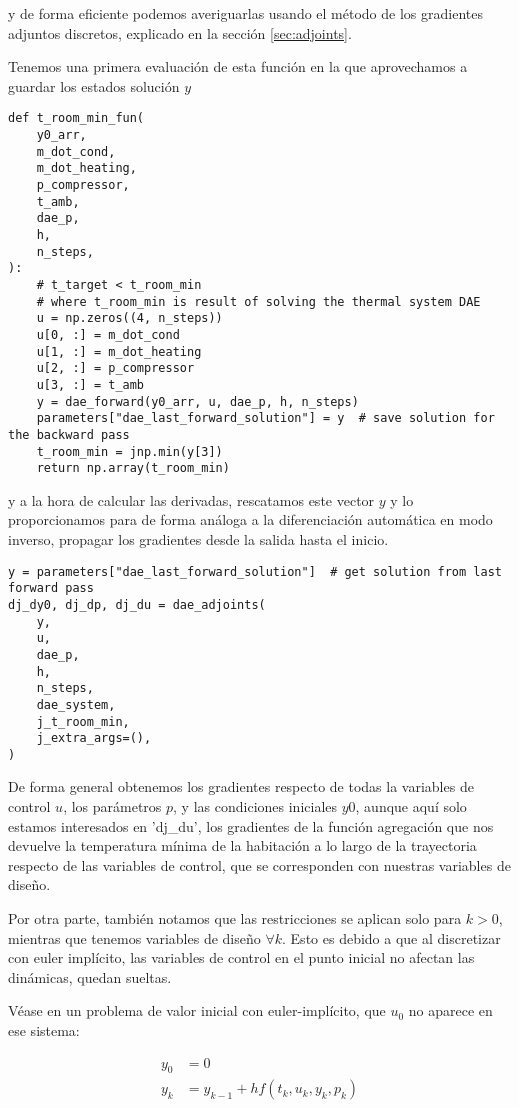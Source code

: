 y de forma eficiente podemos averiguarlas usando el método de los gradientes
adjuntos discretos, explicado en la sección \ref{sec:adjoints}.

Tenemos una primera evaluación de esta función en la que aprovechamos a guardar
los estados solución $y$

\begin{verbatim}
def t_room_min_fun(
    y0_arr,
    m_dot_cond,
    m_dot_heating,
    p_compressor,
    t_amb,
    dae_p,
    h,
    n_steps,
):
    # t_target < t_room_min
    # where t_room_min is result of solving the thermal system DAE
    u = np.zeros((4, n_steps))
    u[0, :] = m_dot_cond
    u[1, :] = m_dot_heating
    u[2, :] = p_compressor
    u[3, :] = t_amb
    y = dae_forward(y0_arr, u, dae_p, h, n_steps)
    parameters["dae_last_forward_solution"] = y  # save solution for the backward pass
    t_room_min = jnp.min(y[3])
    return np.array(t_room_min)
\end{verbatim}

y a la hora de calcular las derivadas, rescatamos este vector $y$ y lo
proporcionamos para de forma análoga a la diferenciación automática en modo
inverso, propagar los gradientes desde la salida hasta el inicio.

\begin{verbatim}
y = parameters["dae_last_forward_solution"]  # get solution from last forward pass
dj_dy0, dj_dp, dj_du = dae_adjoints(
    y,
    u,
    dae_p,
    h,
    n_steps,
    dae_system,
    j_t_room_min,
    j_extra_args=(),
)
\end{verbatim}

De forma general obtenemos los gradientes respecto de todas la variables de
control $u$, los parámetros $p$, y las condiciones iniciales $y0$, aunque aquí
solo estamos interesados en 'dj\_du', los gradientes de la función agregación
que nos devuelve la temperatura mínima de la habitación a lo largo de la
trayectoria respecto de las variables de control, que se corresponden con
nuestras variables de diseño.


Por otra parte, también notamos que las restricciones se aplican solo para
$k > 0$, mientras que tenemos variables de diseño $\forall k$. Esto es debido
a que al discretizar con euler implícito, las variables de control en el
punto inicial no afectan las dinámicas, quedan sueltas.

Véase en un problema de valor inicial con euler-implícito, que $u_0$ no aparece
en ese sistema:

\begin{align*}
	y_0 & = 0                                 \\
	y_k & = y_{k-1} + h f(t_k, u_k, y_k, p_k)
\end{align*}

